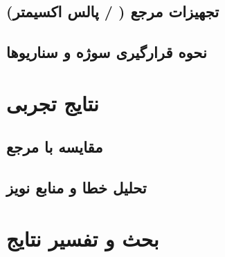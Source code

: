 \subsection{تجهیزات مرجع ( / پالس اکسیمتر)} %
\label{sec:reference-equipment}

\subsection{نحوه قرارگیری سوژه و سناریوها} %
\label{sec:subject-placement-scenarios}

\section{نتایج تجربی} %
\label{sec:experimental-results}

\subsection{مقایسه با مرجع} %
\label{sec:comparison-with-reference}

\subsection{تحلیل خطا و منابع نویز} %
\label{sec:error-noise-analysis}

\section{بحث و تفسیر نتایج} %
\label{sec:discussion-interpretation}
